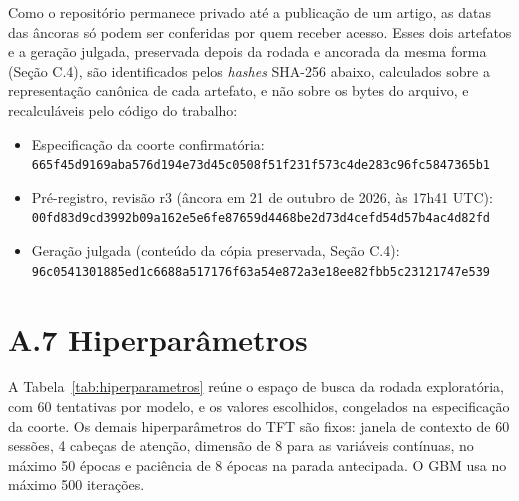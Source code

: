 Como o repositório permanece privado até a publicação de um artigo, as datas das âncoras só podem ser conferidas por quem receber acesso. Esses dois artefatos e a geração julgada, preservada depois da rodada e ancorada da mesma forma (Seção C.4), são identificados pelos \textit{hashes} SHA-256 abaixo, calculados sobre a representação canônica de cada artefato, e não sobre os bytes do arquivo, e recalculáveis pelo código do trabalho:
\begin{itemize}
    \item Especificação da coorte confirmatória:\\ {\footnotesize\texttt{665f45d9169aba576d194e73d45c0508f51f231f573c4de283c96fc5847365b1}}
    \item Pré-registro, revisão r3 (âncora em 21 de outubro de 2026, às 17h41 UTC):\\ {\footnotesize\texttt{00fd83d9cd3992b09a162e5e6fe87659d4468be2d73d4cefd54d57b4ac4d82fd}}
    \item Geração julgada (conteúdo da cópia preservada, Seção C.4):\\ {\footnotesize\texttt{96c0541301885ed1c6688a517176f63a54e872a3e18ee82fbb5c23121747e539}}
\end{itemize}

\section*{A.7 Hiperparâmetros}

A Tabela~\ref{tab:hiperparametros} reúne o espaço de busca da rodada exploratória, com 60 tentativas por modelo, e os valores escolhidos, congelados na especificação da coorte. Os demais hiperparâmetros do TFT são fixos: janela de contexto de 60 sessões, 4 cabeças de atenção, dimensão de 8 para as variáveis contínuas, no máximo 50 épocas e paciência de 8 épocas na parada antecipada. O GBM usa no máximo 500 iterações.

